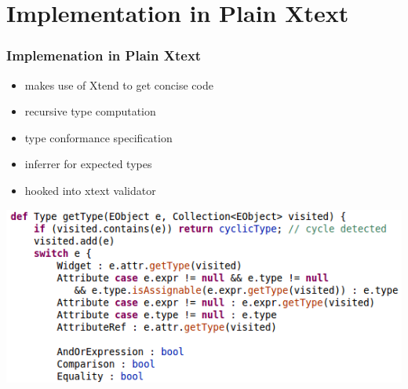 \section[Plain Xtext]{Implementation in Plain Xtext}

\begin{frame}
  \tableofcontents[currentsection]
\end{frame}

\begin{frame}
  \frametitle{Implemenation in Plain Xtext}
  \begin{itemize}
    \item makes use of Xtend to get concise code
    \item recursive type computation
    \item type conformance specification
    \item inferrer for expected types
    \item hooked into xtext validator
  \end{itemize}

\includegraphics[width=.9\textwidth]{img/plain-xtext-provider.png}


\end{frame}